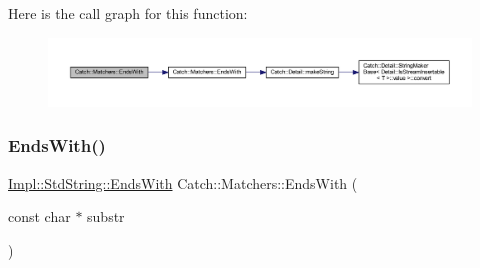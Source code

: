 Here is the call graph for this function\+:\nopagebreak
\begin{figure}[H]
\begin{center}
\leavevmode
\includegraphics[width=350pt]{namespace_catch_1_1_matchers_a1e32a2d23a1eb9eda9840c712c7b00c1_cgraph}
\end{center}
\end{figure}
\hypertarget{namespace_catch_1_1_matchers_ae3e6d8f7fea6fac6513596b23e5d5153}{}\label{namespace_catch_1_1_matchers_ae3e6d8f7fea6fac6513596b23e5d5153} 
\subsubsection{\texorpdfstring{Ends\+With()}{EndsWith()}\hspace{0.1cm}{\footnotesize\ttfamily [2/2]}}
{\footnotesize\ttfamily \hyperlink{struct_catch_1_1_matchers_1_1_impl_1_1_std_string_1_1_ends_with}{Impl\+::\+Std\+String\+::\+Ends\+With} Catch\+::\+Matchers\+::\+Ends\+With (\begin{DoxyParamCaption}\item[{const char $\ast$}]{substr }\end{DoxyParamCaption})\hspace{0.3cm}{\ttfamily [inline]}}

